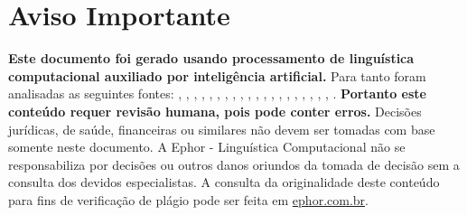\documentclass[
   article,       
   12pt,          
   oneside,       
   a4paper,       
   english,       
   brazil,        
   sumario=tradicional
   ]{abntex2}
\begin{document}
\frenchspacing 
\maketitle

\textual
\section{Aviso Importante}
\textbf{Este documento foi gerado usando processamento de linguística computacional auxiliado por inteligência artificial.} Para tanto foram analisadas as seguintes fontes:  \cite{A_CAUSA_E_AS_POLITICAS_DE_DIREITOS_HUMANOS_NO}, \cite{Ciclo_de_Politicas_Publicas_por_que_e_importa}, \cite{Conheca_o_ciclo_das_politicas_publicas__Polit}, \cite{Educacao_Inclusiva_Conheca_o_historico_da_leg}, \cite{Entendendo_a_Tipologia_de_Politicas_Publicas_}, \cite{Escola_Nacional_de_Administracao_Publica__Wik}, \cite{Especialista_em_politicas_publicas_e_gestao_g}, \cite{FEDERALISMO_E_POLITICAS_PUBLICAS_NO_BRASIL_Ho}, \cite{Ministerio_do_Planejamento_e_Orcamento__Wikip}, \cite{Ministro_defende_que_direitos_humanos_precisa}, \cite{Politica_conceito_politicas_publicas_e_partid}, \cite{Politica_publica__o_que_e_tipos_de_politicas_}, \cite{Politica_publica__Wikipedia_a_enciclopedia_li}, \cite{Politicas_publicas__Wikipedia_la_enciclopedia}, \cite{Politicas_Publicas_entenda_o_que_sao_para_que}, \cite{Politicas_Publicas_o_que_sao_e_para_que_serve}, \cite{Politicas_publicas_o_que_sao_e_para_que_serve}, \cite{Politicas_publicas_o_que_sao_quem_faz_e_tipos}, \cite{Politicas_publicas_o_que_sao_tipos_e_exemplos}, \cite{Revista_USP_119__Dossie_1_Democracia_e_politi}, \cite{TCU_Ciclo_das_politicas_publicas__Tudo_o_que_}.
\textbf{Portanto este conteúdo requer revisão humana, pois pode conter erros.} Decisões jurídicas, de saúde, financeiras ou similares não devem ser tomadas com base somente neste documento. A Ephor - Linguística Computacional não se responsabiliza por decisões ou outros danos oriundos da tomada de decisão sem a consulta dos devidos especialistas.
A consulta da originalidade deste conteúdo para fins de verificação de plágio pode ser feita em \href{http://www.ephor.com.br}{ephor.com.br}.
\end{document}
